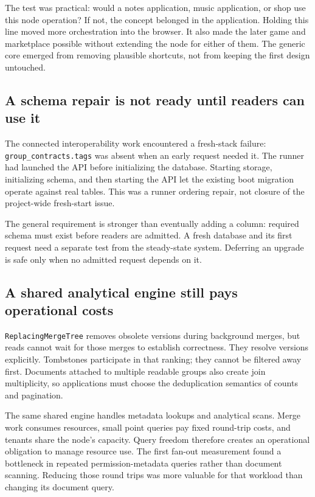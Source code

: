 \documentclass[sigconf, nonacm]{acmart}
\begin{document}
The test was practical: would a notes application, music application,
or shop use this node operation? If not, the concept belonged in the
application. Holding this line moved more orchestration into the browser.
It also made the later game and marketplace possible without extending
the node for either of them. The generic core emerged from removing
plausible shortcuts, not from keeping the first design untouched.

\subsection{A schema repair is not ready until readers can use it}

The connected interoperability work encountered a fresh-stack failure:
\texttt{group\_contracts.tags} was absent when an early request needed
it. The runner had launched the API before initializing the database.
Starting storage, initializing schema, and then starting the API let the
existing boot migration operate against real tables. This was a runner
ordering repair, not closure of the project-wide fresh-start issue.

The general requirement is stronger than eventually adding a column:
required schema must exist before readers are admitted. A fresh database
and its first request need a separate test from the steady-state system.
Deferring an upgrade is safe only when no admitted request depends on it.

\subsection{A shared analytical engine still pays operational costs}

\texttt{ReplacingMergeTree} removes obsolete versions during background
merges, but reads cannot wait for those merges to establish correctness.
They resolve versions explicitly. Tombstones participate in that ranking;
they cannot be filtered away first. Documents attached to multiple readable
groups also create join multiplicity, so applications must choose the
deduplication semantics of counts and pagination.

The same shared engine handles metadata lookups and analytical scans.
Merge work consumes resources, small point queries pay fixed round-trip
costs, and tenants share the node's capacity. Query freedom therefore
creates an operational obligation to manage resource use. The first
fan-out measurement found a bottleneck in repeated permission-metadata
queries rather than document scanning. Reducing those round trips was
more valuable for that workload than changing its document query.
\end{document}
